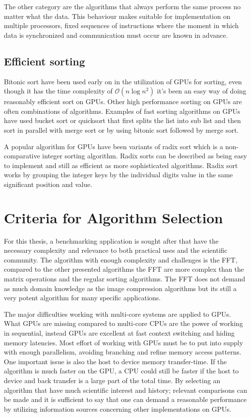 The other category are the algorithms that always perform the same process no matter what the data. This behaviour makes suitable for implementation on multiple processors, fixed sequences of instructions where the moment in which data is synchronized and communication must occur are known in advance.

\subsection{Efficient sorting}
Bitonic sort have been used early on in the utilization of \gls{GPU}s for sorting, even though it has the time complexity of $\mathcal{O}(n\log{n^2})$ it's been an easy way of doing reasonably efficient sort on \gls{GPU}s. Other high performance sorting on \gls{GPU}s are often combinations of algorithms. Examples of fast sorting algorithms on GPUs have used bucket sort or quicksort that first splits the list into sub list and then sort in parallel with merge sort or by using bitonic sort followed by merge sort.

A popular algorithm for GPUs have been variants of radix sort which is a non-comparative integer sorting algorithm. Radix sorts can be described as being easy to implement and still as efficient as more sophisticated algorithms. Radix sort works by grouping the integer keys by the individual digits value in the same significant position and value.

\section{Criteria for Algorithm Selection}
For this thesis, a benchmarking application is sought after that have the necessary complexity and relevance to both practical uses and the scientific community. The algorithm with enough complexity and challenges is the \gls{FFT}, compared to the other presented algorithms the \gls{FFT} are more complex than the matrix operations and the regular sorting algorithms. The \gls{FFT} does not demand as much domain knowledge as the image compression algorithms but its still a very potent algorithm for many specific applications.

The major difficulties working with multi-core systems are applied to \gls{GPU}s. What \gls{GPU}s are missing compared to multi-core \gls{CPU}s are the power of working in sequential, instead \gls{GPU}s are excellent at fast context switching and hiding memory latencies. Most effort of working with \gls{GPU}s must be to put into supply with enough parallelism, avoiding branching and refine memory access patterns. One important issue is also the host to device memory transfer-time. If the algorithm is much faster on the \gls{GPU}, a \gls{CPU} could still be faster if the host to device and back transfer is a large part of the total time.
By selecting an algorithm that have much scientific interest and history; relevant comparisons can be made and it is sufficient to say that one can demand a reasonable performance by utilizing information sources concerning other implementations on \gls{GPU}s.